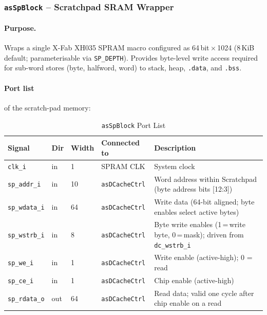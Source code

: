 \subsubsection{\texttt{asSpBlock} -- Scratchpad SRAM Wrapper}
\label{subsubsec:asSpBlock}

\paragraph{Purpose.}
Wraps a single X-Fab XH035 SPRAM macro configured as
64\,bit\,$\times$\,1024 (8\,KiB default; parameterisable via
\texttt{SP\_DEPTH}).
Provides byte-level write access required for sub-word stores (byte,
halfword, word) to stack, heap, \texttt{.data}, and \texttt{.bss}.

\paragraph{Port list} of the scratch-pad memory:

\begin{table}[H]
\caption{\texttt{asSpBlock} Port List}
\label{tab:asSpBlockPorts}
\centering
\begin{tabularx}{\textwidth}{|l |l |l |l |X|}
  \hline
  Signal & Dir & Width & Connected to & Description \\
  \hline
  \hline
  \texttt{clk\_i}        & in  & 1  & SPRAM CLK             & System clock \\
  \hline
  \texttt{sp\_addr\_i}   & in  & 10 & \texttt{asDCacheCtrl} & Word address within Scratchpad (byte address bits [12:3]) \\
  \hline
  \texttt{sp\_wdata\_i}  & in  & 64 & \texttt{asDCacheCtrl} & Write data (64-bit aligned; byte enables select active bytes) \\
  \hline
  \texttt{sp\_wstrb\_i}  & in  & 8  & \texttt{asDCacheCtrl} & Byte write enables (1\,=\,write byte, 0\,=\,mask); driven from \texttt{dc\_wstrb\_i} \\
  \hline
  \texttt{sp\_we\_i}     & in  & 1  & \texttt{asDCacheCtrl} & Write enable (active-high); 0 = read \\
  \hline
  \texttt{sp\_ce\_i}     & in  & 1  & \texttt{asDCacheCtrl} & Chip enable (active-high) \\
  \hline
  \texttt{sp\_rdata\_o}  & out & 64 & \texttt{asDCacheCtrl} & Read data; valid one cycle after chip enable on a read \\
  \hline
\end{tabularx}
\end{table}

